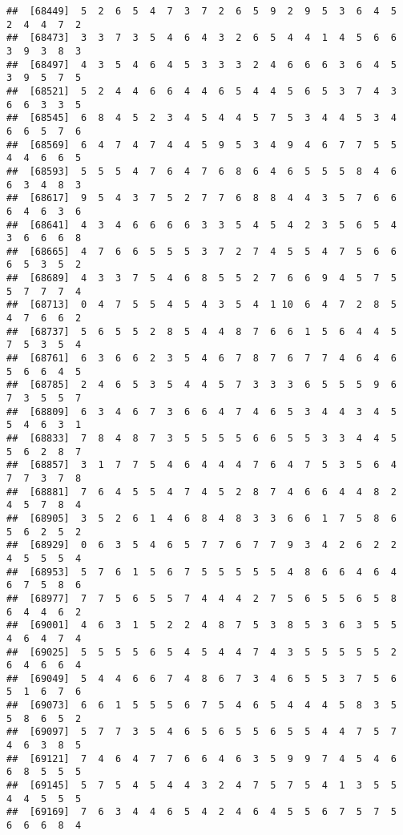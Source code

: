 \documentclass[
]{book}
\begin{document}
\begin{verbatim}
##  [68449]  5  2  6  5  4  7  3  7  2  6  5  9  2  9  5  3  6  4  5  2  4  4  7  2
##  [68473]  3  3  7  3  5  4  6  4  3  2  6  5  4  4  1  4  5  6  6  3  9  3  8  3
##  [68497]  4  3  5  4  6  4  5  3  3  3  2  4  6  6  6  3  6  4  5  3  9  5  7  5
##  [68521]  5  2  4  4  6  6  4  4  6  5  4  4  5  6  5  3  7  4  3  6  6  3  3  5
##  [68545]  6  8  4  5  2  3  4  5  4  4  5  7  5  3  4  4  5  3  4  6  6  5  7  6
##  [68569]  6  4  7  4  7  4  4  5  9  5  3  4  9  4  6  7  7  5  5  4  4  6  6  5
##  [68593]  5  5  5  4  7  6  4  7  6  8  6  4  6  5  5  5  8  4  6  6  3  4  8  3
##  [68617]  9  5  4  3  7  5  2  7  7  6  8  8  4  4  3  5  7  6  6  6  4  6  3  6
##  [68641]  4  3  4  6  6  6  6  3  3  5  4  5  4  2  3  5  6  5  4  3  6  6  6  8
##  [68665]  4  7  6  6  5  5  5  3  7  2  7  4  5  5  4  7  5  6  6  6  5  3  5  2
##  [68689]  4  3  3  7  5  4  6  8  5  5  2  7  6  6  9  4  5  7  5  5  7  7  7  4
##  [68713]  0  4  7  5  5  4  5  4  3  5  4  1 10  6  4  7  2  8  5  4  7  6  6  2
##  [68737]  5  6  5  5  2  8  5  4  4  8  7  6  6  1  5  6  4  4  5  7  5  3  5  4
##  [68761]  6  3  6  6  2  3  5  4  6  7  8  7  6  7  7  4  6  4  6  5  6  6  4  5
##  [68785]  2  4  6  5  3  5  4  4  5  7  3  3  3  6  5  5  5  9  6  7  3  5  5  7
##  [68809]  6  3  4  6  7  3  6  6  4  7  4  6  5  3  4  4  3  4  5  5  4  6  3  1
##  [68833]  7  8  4  8  7  3  5  5  5  5  6  6  5  5  3  3  4  4  5  5  6  2  8  7
##  [68857]  3  1  7  7  5  4  6  4  4  4  7  6  4  7  5  3  5  6  4  7  7  3  7  8
##  [68881]  7  6  4  5  5  4  7  4  5  2  8  7  4  6  6  4  4  8  2  4  5  7  8  4
##  [68905]  3  5  2  6  1  4  6  8  4  8  3  3  6  6  1  7  5  8  6  5  6  2  5  2
##  [68929]  0  6  3  5  4  6  5  7  7  6  7  7  9  3  4  2  6  2  2  4  5  5  5  4
##  [68953]  5  7  6  1  5  6  7  5  5  5  5  5  4  8  6  6  4  6  4  6  7  5  8  6
##  [68977]  7  7  5  6  5  5  7  4  4  4  2  7  5  6  5  5  6  5  8  6  4  4  6  2
##  [69001]  4  6  3  1  5  2  2  4  8  7  5  3  8  5  3  6  3  5  5  4  6  4  7  4
##  [69025]  5  5  5  5  6  5  4  5  4  4  7  4  3  5  5  5  5  5  2  6  4  6  6  4
##  [69049]  5  4  4  6  6  7  4  8  6  7  3  4  6  5  5  3  7  5  6  5  1  6  7  6
##  [69073]  6  6  1  5  5  5  6  7  5  4  6  5  4  4  4  5  8  3  5  5  8  6  5  2
##  [69097]  5  7  7  3  5  4  6  5  6  5  5  6  5  5  4  4  7  5  7  4  6  3  8  5
##  [69121]  7  4  6  4  7  7  6  6  4  6  3  5  9  9  7  4  5  4  6  6  8  5  5  5
##  [69145]  5  7  5  4  5  4  4  3  2  4  7  5  7  5  4  1  3  5  5  4  4  5  5  5
##  [69169]  7  6  3  4  4  6  5  4  2  4  6  4  5  5  6  7  5  7  5  6  6  6  8  4

\end{verbatim}
\end{document}
